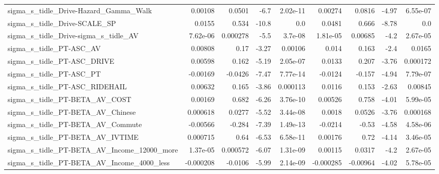 \begin{tabular}{lrrrrrrrr}
sigma\_s\_tidle\_Drive-Hazard\_Gamma\_Walk              &     0.00108 &       0.0501 &     -6.7 & 2.02e-11 &    0.00274 &      0.0816 &        -4.97 &      6.55e-07 \\
sigma\_s\_tidle\_Drive-SCALE\_SP                       &      0.0155 &        0.534 &    -10.8 &      0.0 &     0.0481 &       0.666 &        -8.78 &           0.0 \\
sigma\_s\_tidle\_Drive-sigma\_s\_tidle\_AV               &    7.62e-06 &     0.000278 &     -5.5 &  3.7e-08 &   1.81e-05 &     0.00685 &         -4.2 &      2.67e-05 \\
sigma\_s\_tidle\_PT-ASC\_AV                            &     0.00808 &         0.17 &    -3.27 &  0.00106 &      0.014 &       0.163 &         -2.4 &        0.0165 \\
sigma\_s\_tidle\_PT-ASC\_DRIVE                         &     0.00598 &        0.162 &    -5.19 & 2.05e-07 &     0.0133 &       0.207 &        -3.76 &      0.000172 \\
sigma\_s\_tidle\_PT-ASC\_PT                            &    -0.00169 &      -0.0426 &    -7.47 & 7.77e-14 &    -0.0124 &      -0.157 &        -4.94 &      7.79e-07 \\
sigma\_s\_tidle\_PT-ASC\_RIDEHAIL                      &     0.00632 &        0.165 &    -3.86 & 0.000113 &     0.0116 &       0.153 &        -2.63 &       0.00845 \\
sigma\_s\_tidle\_PT-BETA\_AV\_COST                      &     0.00169 &        0.682 &    -6.26 & 3.76e-10 &    0.00526 &       0.758 &        -4.01 &      5.99e-05 \\
sigma\_s\_tidle\_PT-BETA\_AV\_Chinese                   &    0.000618 &       0.0277 &    -5.52 & 3.44e-08 &     0.0018 &      0.0526 &        -3.76 &      0.000168 \\
sigma\_s\_tidle\_PT-BETA\_AV\_Commute                   &    -0.00566 &       -0.284 &    -7.39 & 1.49e-13 &    -0.0214 &       -0.53 &        -4.58 &      4.58e-06 \\
sigma\_s\_tidle\_PT-BETA\_AV\_IVTIME                    &    0.000715 &         0.64 &    -6.53 & 6.58e-11 &    0.00176 &        0.72 &        -4.14 &      3.46e-05 \\
sigma\_s\_tidle\_PT-BETA\_AV\_Income\_12000\_more         &    1.37e-05 &     0.000572 &    -6.07 & 1.31e-09 &    0.00115 &      0.0317 &         -4.2 &      2.67e-05 \\
sigma\_s\_tidle\_PT-BETA\_AV\_Income\_4000\_less          &   -0.000208 &      -0.0106 &    -5.99 & 2.14e-09 &  -0.000285 &    -0.00964 &        -4.02 &      5.78e-05 \\

\end{tabular}
